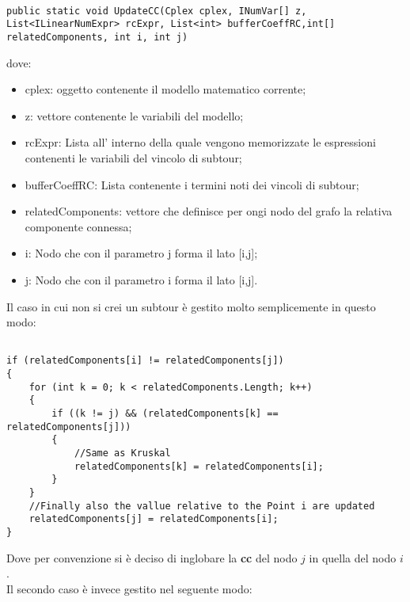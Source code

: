 \documentclass[11pt]{article}
\begin{document}
\begin{lstlisting}

public static void UpdateCC(Cplex cplex, INumVar[] z, List<ILinearNumExpr> rcExpr, List<int> bufferCoeffRC,int[] relatedComponents, int i, int j)

\end{lstlisting}

dove:
\begin{itemize}
\item cplex: oggetto contenente il modello matematico corrente;
\item z: vettore contenente le variabili del modello;
\item rcExpr: Lista all' interno della quale vengono memorizzate le espressioni contenenti le variabili del vincolo di subtour;
\item bufferCoeffRC: Lista contenente i termini noti dei vincoli di subtour;
\item relatedComponents: vettore che definisce per ongi nodo del grafo la relativa componente connessa;
\item i: Nodo che con il parametro j forma il lato [i,j];
\item j: Nodo che con il parametro i forma il lato [i,j].
\end{itemize}

Il caso in cui non si crei un subtour è gestito molto semplicemente in questo modo:

\begin{lstlisting}

if (relatedComponents[i] != relatedComponents[j])
{
    for (int k = 0; k < relatedComponents.Length; k++)
    {
        if ((k != j) && (relatedComponents[k] == relatedComponents[j]))
        {
            //Same as Kruskal
            relatedComponents[k] = relatedComponents[i];
        }
    }
    //Finally also the vallue relative to the Point i are updated
    relatedComponents[j] = relatedComponents[i];
}

\end{lstlisting}

Dove per convenzione si è deciso di inglobare la \textbf{cc} del nodo $j$ in quella del nodo $i$.\\
Il secondo caso è invece gestito nel seguente modo:
\end{document}
